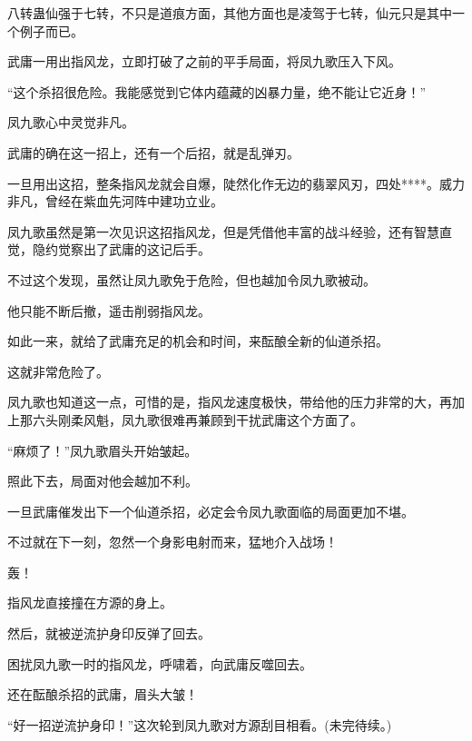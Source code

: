 \begin{this_body}
八转蛊仙强于七转，不只是道痕方面，其他方面也是凌驾于七转，仙元只是其中一个例子而已。

武庸一用出指风龙，立即打破了之前的平手局面，将凤九歌压入下风。

“这个杀招很危险。我能感觉到它体内蕴藏的凶暴力量，绝不能让它近身！”

凤九歌心中灵觉非凡。

武庸的确在这一招上，还有一个后招，就是乱弹刃。

一旦用出这招，整条指风龙就会自爆，陡然化作无边的翡翠风刃，四处****。威力非凡，曾经在紫血先河阵中建功立业。

凤九歌虽然是第一次见识这招指风龙，但是凭借他丰富的战斗经验，还有智慧直觉，隐约觉察出了武庸的这记后手。

不过这个发现，虽然让凤九歌免于危险，但也越加令凤九歌被动。

他只能不断后撤，遥击削弱指风龙。

如此一来，就给了武庸充足的机会和时间，来酝酿全新的仙道杀招。

这就非常危险了。

凤九歌也知道这一点，可惜的是，指风龙速度极快，带给他的压力非常的大，再加上那六头刚柔风魁，凤九歌很难再兼顾到干扰武庸这个方面了。

“麻烦了！”凤九歌眉头开始皱起。

照此下去，局面对他会越加不利。

一旦武庸催发出下一个仙道杀招，必定会令凤九歌面临的局面更加不堪。

不过就在下一刻，忽然一个身影电射而来，猛地介入战场！

轰！

指风龙直接撞在方源的身上。

然后，就被逆流护身印反弹了回去。

困扰凤九歌一时的指风龙，呼啸着，向武庸反噬回去。

还在酝酿杀招的武庸，眉头大皱！

“好一招逆流护身印！”这次轮到凤九歌对方源刮目相看。(未完待续。)

\end{this_body}

